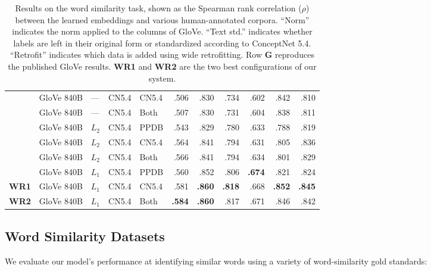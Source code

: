 \documentclass[11pt,letterpaper]{article}
\begin{document}
\begin{table*}[t]
\begin{tabular}{lllllrrrrrr}
       &GloVe 840B   & ---   & CN5.4     & CN5.4    &     .506 &     .830 &      .734 &      .602 &     .842 &     .810 \\
       &GloVe 840B   & ---   & CN5.4     & Both     &     .507 &     .830 &      .731 &      .604 &     .838 &     .811 \\
       &GloVe 840B   & $L_2$ & CN5.4     & PPDB     &     .543 &     .829 &      .780 &      .633 &     .788 &     .819 \\
       &GloVe 840B   & $L_2$ & CN5.4     & CN5.4    &     .564 &     .841 &      .794 &      .631 &     .805 &     .836 \\
       &GloVe 840B   & $L_2$ & CN5.4     & Both     &     .566 &     .841 &      .794 &      .634 &     .801 &     .829 \\
       &GloVe 840B   & $L_1$ & CN5.4     & PPDB     &     .560 &     .852 &      .806 & {\bf .674}&     .821 &     .824 \\
\bf WR1&GloVe 840B   & $L_1$ & CN5.4     & CN5.4    &     .581 &{\bf .860}& {\bf .818}&      .668 &{\bf .852}&{\bf .845}\\
\bf WR2&GloVe 840B   & $L_1$ & CN5.4     & Both     &{\bf .584}&{\bf .860}&      .817 &      .671 &     .846 &     .842 \\
\bottomrule
\end{tabular}

\caption{
    Results on the word similarity task, shown as the Spearman rank correlation
    ($\rho$) between the learned embeddings and various human-annotated corpora.
    ``Norm'' indicates the norm applied to the columns of GloVe.
    ``Text std.'' indicates whether labels are left in their original form or
    standardized according to ConceptNet 5.4. ``Retrofit'' indicates which data
    is added using wide retrofitting.
    Row {\bf G} reproduces the published GloVe results.
    {\bf WR1} and {\bf WR2} are the two best configurations of our system.
}
\label{eval-bigtable}
\end{table*}

\subsection{Word Similarity Datasets}

We evaluate our model's performance at identifying similar words using a
variety of word-similarity gold standards:
\end{document}
